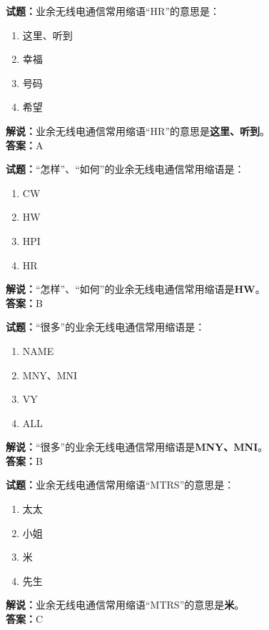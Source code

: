 \documentclass{ctexbook}
\begin{document}
\bigskip


\noindent\textbf{试题：}业余无线电通信常用缩语“HR”的意思是：
\begin{enumerate}[leftmargin=3em]
\item 这里、听到
\item 幸福
\item 号码
\item 希望
\end{enumerate}
\noindent\textbf{解说：}业余无线电通信常用缩语“HR”的意思是\textbf{这里、听到}。\\\noindent\textbf{答案：}A

\bigskip


\noindent\textbf{试题：}“怎样”、“如何”的业余无线电通信常用缩语是：
\begin{enumerate}[leftmargin=3em]
\item CW
\item HW
\item HPI
\item HR
\end{enumerate}
\noindent\textbf{解说：}“怎样”、“如何”的业余无线电通信常用缩语是\textbf{HW}。\\\noindent\textbf{答案：}B



\bigskip


\noindent\textbf{试题：}“很多”的业余无线电通信常用缩语是：
\begin{enumerate}[leftmargin=3em]
\item NAME
\item MNY、MNI
\item VY
\item ALL
\end{enumerate}
\noindent\textbf{解说：}“很多”的业余无线电通信常用缩语是\textbf{MNY、MNI}。\\\noindent\textbf{答案：}B



\bigskip


\noindent\textbf{试题：}业余无线电通信常用缩语“MTRS”的意思是：
\begin{enumerate}[leftmargin=3em]
\item 太太
\item 小姐
\item 米
\item 先生
\end{enumerate}
\noindent\textbf{解说：}业余无线电通信常用缩语“MTRS”的意思是\textbf{米}。\\\noindent\textbf{答案：}C
\end{document}
